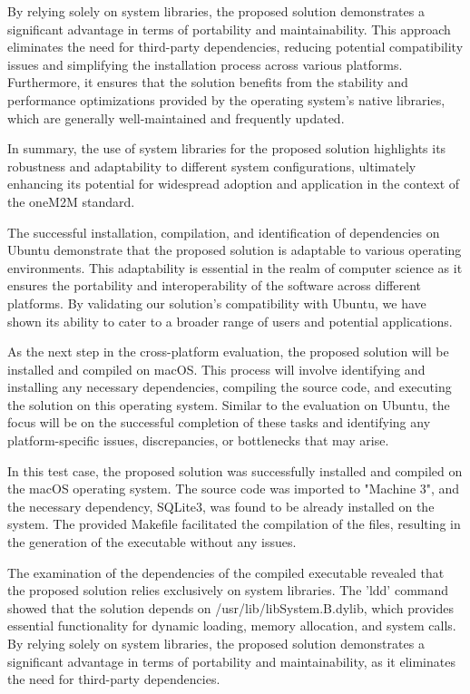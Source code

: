 \documentclass[a4paper,fleqn]{cas-dc}
\begin{document}
By relying solely on system libraries, the proposed solution demonstrates a significant advantage in terms of portability and maintainability. This approach eliminates the need for third-party dependencies, reducing potential compatibility issues and simplifying the installation process across various platforms. Furthermore, it ensures that the solution benefits from the stability and performance optimizations provided by the operating system's native libraries, which are generally well-maintained and frequently updated.

In summary, the use of system libraries for the proposed solution highlights its robustness and adaptability to different system configurations, ultimately enhancing its potential for widespread adoption and application in the context of the oneM2M standard.

The successful installation, compilation, and identification of dependencies on Ubuntu demonstrate that the proposed solution is adaptable to various operating environments. This adaptability is essential in the realm of computer science as it ensures the portability and interoperability of the software across different platforms. By validating our solution's compatibility with Ubuntu, we have shown its ability to cater to a broader range of users and potential applications.

As the next step in the cross-platform evaluation, the proposed solution will be installed and compiled on macOS. This process will involve identifying and installing any necessary dependencies, compiling the source code, and executing the solution on this operating system. Similar to the evaluation on Ubuntu, the focus will be on the successful completion of these tasks and identifying any platform-specific issues, discrepancies, or bottlenecks that may arise.

In this test case, the proposed solution was successfully installed and compiled on the macOS operating system. The source code was imported to "Machine 3", and the necessary dependency, SQLite3, was found to be already installed on the system. The provided Makefile facilitated the compilation of the files, resulting in the generation of the executable without any issues.

The examination of the dependencies of the compiled executable revealed that the proposed solution relies exclusively on system libraries. The 'ldd' command showed that the solution depends on /usr/lib/libSystem.B.dylib, which provides essential functionality for dynamic loading, memory allocation, and system calls. By relying solely on system libraries, the proposed solution demonstrates a significant advantage in terms of portability and maintainability, as it eliminates the need for third-party dependencies.
\end{document}
